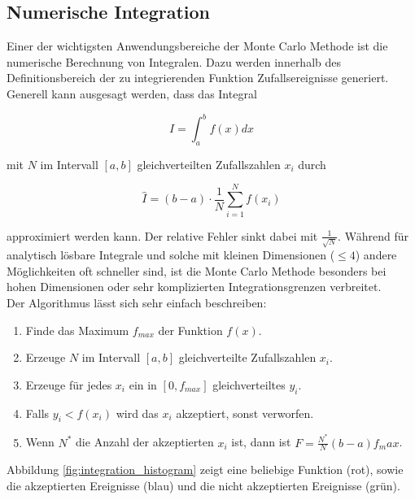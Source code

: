 \documentclass{book}
\begin{document}
\begin{refsection}
\clearpage
\subsection{Numerische Integration} \label{subsec:numIntegration}
Einer der wichtigsten Anwendungsbereiche der Monte Carlo Methode ist die numerische Berechnung von Integralen. Dazu werden innerhalb des Definitionsbereich der zu integrierenden Funktion Zufallsereignisse generiert. Generell kann ausgesagt werden, dass das Integral

\begin{equation}
	I = \int_a^b f(x) dx
\end{equation} 

mit $N$ im Intervall $[a,b]$ gleichverteilten Zufallszahlen $x_i$ durch

\begin{equation}
	\hat{I} = (b-a) \cdot \frac{1}{N} \sum_{i=1}^{N} f(x_i)
\end{equation}

approximiert werden kann. Der relative Fehler sinkt dabei mit $\frac{1}{\sqrt{N}}$. Während für analytisch lösbare Integrale und solche mit kleinen Dimensionen ($\leq 4$) andere Möglichkeiten oft schneller sind, ist die Monte Carlo Methode besonders bei hohen Dimensionen oder sehr komplizierten Integrationsgrenzen verbreitet. \\

Der Algorithmus lässt sich sehr einfach beschreiben:

\begin{enumerate}
	\item Finde das Maximum $f_{max}$ der Funktion $f(x)$.
	\item Erzeuge $N$ im Intervall $[a,b]$ gleichverteilte Zufallszahlen $x_i$.
	\item Erzeuge für jedes $x_i$ ein in $[0,f_{max}]$ gleichverteiltes $y_i$.
	\item Falls $y_i < f(x_i)$ wird das $x_i$ akzeptiert, sonst verworfen.
	\item Wenn $N^*$ die Anzahl der akzeptierten $x_i$ ist, dann ist $F = \frac{N^*}{N}(b-a)f_max$.
\end{enumerate}

Abbildung \ref{fig:integration_histogram} zeigt eine beliebige Funktion (rot), sowie die akzeptierten Ereignisse (blau) und die nicht akzeptierten Ereignisse (grün). \\


\end{refsection}
\end{document}
